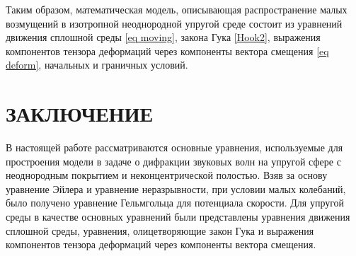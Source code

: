 Таким образом, математическая модель, описывающая распространение малых возмущений в изотропной неоднородной упругой среде состоит из уравнений движения сплошной среды \eqref{eq moving}, закона Гука \eqref{Hook2}, выражения компонентов тензора деформаций через компоненты вектора смещения \eqref{eq deform}, начальных и граничных условий.


\newpage

\section*{ЗАКЛЮЧЕНИЕ}

В настоящей работе рассматриваются основные уравнения, используемые для простроения модели в задаче о дифракции звуковых волн на упругой сфере с неоднородным покрытием и неконцентрической полостью. Взяв за основу уравнение Эйлера и уравнение неразрывности, при условии малых колебаний, было получено уравнение Гельмгольца для потенциала скорости. Для упругой среды в качестве основных уравнений были представлены уравнения движения сплошной среды, уравнения, олицетворяющие закон Гука и выражения компонентов тензора деформаций через компоненты вектора смещения. 






